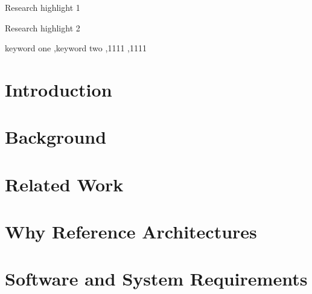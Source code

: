 \documentclass[preprint,12pt]{elsarticle}
\begin{document}
\begin{frontmatter}

\begin{highlights}
\item Research highlight 1
\item Research highlight 2
\end{highlights}

\begin{keyword}
keyword one \sep keyword two
 \sep 1111
 \sep 1111
\end{keyword}

\end{frontmatter}


\section{Introduction}
\label{sec:introduction}

\section{Background}
\label{sec:background}

\section{Related Work}
\label{sec:related_work}

\section{Why Reference Architectures}
\label{sec:why_reference_architectures}

\section{Software and System Requirements}
\label{sec:software_and_system_requirements}
\end{document}

